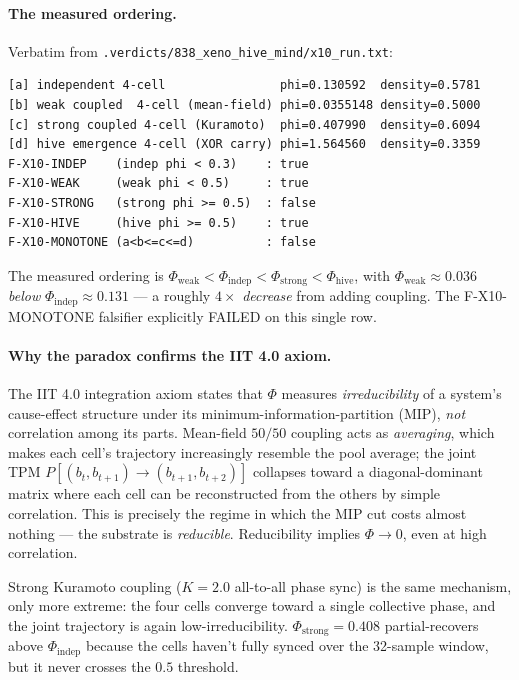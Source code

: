 \documentclass[11pt,a4paper]{article}
\begin{document}
\paragraph{The measured ordering.}
Verbatim from \texttt{.verdicts/838\_xeno\_hive\_mind/x10\_run.txt}:
\begin{lstlisting}
[a] independent 4-cell                phi=0.130592  density=0.5781
[b] weak coupled  4-cell (mean-field) phi=0.0355148 density=0.5000
[c] strong coupled 4-cell (Kuramoto)  phi=0.407990  density=0.6094
[d] hive emergence 4-cell (XOR carry) phi=1.564560  density=0.3359
F-X10-INDEP    (indep phi < 0.3)    : true
F-X10-WEAK     (weak phi < 0.5)     : true
F-X10-STRONG   (strong phi >= 0.5)  : false
F-X10-HIVE     (hive phi >= 0.5)    : true
F-X10-MONOTONE (a<b<=c<=d)          : false
\end{lstlisting}

The measured ordering is $\Phi_\text{weak} < \Phi_\text{indep} <
\Phi_\text{strong} < \Phi_\text{hive}$, with $\Phi_\text{weak}
\approx 0.036$ \emph{below} $\Phi_\text{indep} \approx 0.131$ ---
a roughly $4\times$ \emph{decrease} from adding coupling. The
F-X10-MONOTONE falsifier explicitly FAILED on this single row.

\paragraph{Why the paradox confirms the IIT 4.0 axiom.}
The IIT 4.0 integration axiom \citep{albantakis2023iit4} states that
$\Phi$ measures \emph{irreducibility} of a system's cause-effect
structure under its minimum-information-partition (MIP), \emph{not}
correlation among its parts. Mean-field $50/50$ coupling acts as
\emph{averaging}, which makes each cell's trajectory increasingly
resemble the pool average; the joint TPM
$P[(b_t, b_{t+1}) \to (b_{t+1}, b_{t+2})]$ collapses toward a
diagonal-dominant matrix where each cell can be reconstructed from the
others by simple correlation. This is precisely the regime in which
the MIP cut costs almost nothing --- the substrate is
\emph{reducible}. Reducibility implies $\Phi \to 0$, even at high
correlation.

Strong Kuramoto coupling ($K=2.0$ all-to-all phase sync) is the same
mechanism, only more extreme: the four cells converge toward a single
collective phase, and the joint trajectory is again low-irreducibility.
$\Phi_\text{strong} = 0.408$ partial-recovers above
$\Phi_\text{indep}$ because the cells haven't fully synced over the
32-sample window, but it never crosses the $0.5$ threshold.
\end{document}
